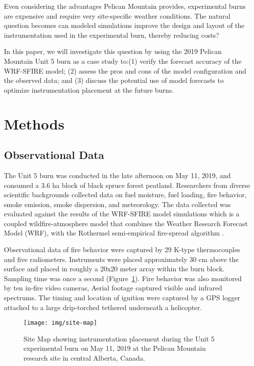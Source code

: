 \documentclass[preprints,article,accept,moreauthors,pdftex]{Definitions/mdpi}
\begin{document}
Even considering the advantages Pelican Mountain provides, experimental burns are expensive and require very site-specific weather conditions. The natural question becomes can modeled simulations improve the design and layout of the instrumentation used in the experimental burn, thereby reducing costs?

In this paper, we will investigate this question by using the 2019 Pelican Mountain Unit 5 burn as a case study to:(1) verify the forecast accuracy of the WRF-SFIRE model; (2) assess the pros and cons of the model configuration and the observed data; and (3) discuss the potential use of model forecasts to optimize instrumentation placement at the future burns.

\section{Methods}
\subsection{Observational Data}

The Unit 5 burn was conducted in the late afternoon on May 11, 2019, and consumed a 3.6 ha block of black spruce forest peatland. Researchers from diverse scientific backgrounds collected data on fuel moisture, fuel loading, fire behavior, smoke emission, smoke dispersion, and meteorology. The data collected was evaluated against the results of the WRF-SFIRE model simulations which is a coupled wildfire-atmosphere model that combines the Weather Research Forecast Model (WRF), with the Rothermel semi-empirical fire-spread algorithm \cite{mandel_coupled_2011,mandel_recent_2014}.

Observational data of fire behavior were captured by 29 K-type thermocouples and five radiometers. Instruments were placed approximately 30 cm above the surface and placed in roughly a 20x20 meter array within the burn block. Sampling time was once a second (Figure~\ref{fig1}). Fire behavior was also monitored by ten in-fire video cameras, Aerial footage captured visible and infrared spectrums. The timing and location of ignition were captured by a GPS logger attached to a large drip-torched tethered underneath a helicopter.


\begin{figure}[H]
\centering
 \texttt{[image: img/site-map]}
 \caption{Site Map showing instrumentation placement during the Unit 5 experimental burn on May 11, 2019 at the Pelican Mountain research site in central Alberta, Canada. \label{fig1}}
 \end{figure}
\end{document}
